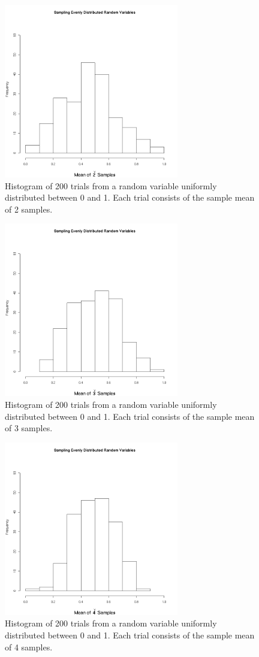 \documentclass[12pt]{article}
\begin{document}
\begin{figure}[htp]
  \centerline{\includegraphics[height=3in]{centralLimit2}}
  \caption{Histogram of 200 trials from a random variable uniformly
    distributed between 0 and 1. Each trial consists of the sample
    mean of 2 samples.}
  \label{fig:centralLimitTwo}
\end{figure}

\begin{figure}[htp]
  \centerline{\includegraphics[height=3in]{centralLimit3}}
  \caption{Histogram of 200 trials from a random variable uniformly
    distributed between 0 and 1. Each trial consists of the sample
    mean of 3 samples.}
  \label{fig:centralLimitThree}
\end{figure}

\begin{figure}[htp]
  \centerline{\includegraphics[height=3in]{centralLimit4}}
  \caption{Histogram of 200 trials from a random variable uniformly
    distributed between 0 and 1. Each trial consists of the sample
    mean of 4 samples.}
  \label{fig:centralLimitFour}
\end{figure}
\end{document}
